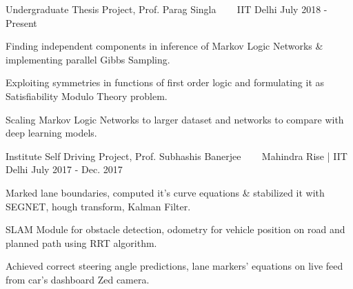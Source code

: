 


\begin{cventries}

  
  \cventry
  {Undergraduate Thesis Project, Prof. Parag Singla}
  {\href{https://github.com/saketdingliwal/MLN-Inference-Task}{}
    \ \ \ \normalfont\href{https://github.com/saketdingliwal/MLN-Inference-Task}
    {}}
  {IIT Delhi}
  {July 2018 - Present}
  {
    \begin{cvitems}
    \item Finding independent components in inference of Markov Logic Networks \& implementing parallel Gibbs Sampling.
    \item Exploiting symmetries in functions of first order logic and formulating it as Satisfiability Modulo Theory problem.
    \item Scaling Markov Logic Networks to larger dataset and networks to compare with deep learning models.
    \end{cvitems}
  }

  \cventry
  {Institute Self Driving Project, Prof. Subhashis Banerjee}
  {\href{https://github.com/AniketBajpai/AutoNav2}{}
    \ \ \ \normalfont\href{https://github.com/AniketBajpai/AutoNav2}
    {}}
  {Mahindra Rise | IIT Delhi}
  {July 2017 - Dec. 2017}
  {
    \begin{cvitems}
    \item Marked lane boundaries, computed it's curve equations \& stabilized it with SEGNET, hough transform, Kalman Filter.
    \item SLAM Module for obstacle detection, odometry for         vehicle position on road and planned path using RRT         algorithm.
    \item Achieved correct steering angle predictions, lane markers' equations on live feed from car's dashboard Zed camera.
    \end{cvitems}
  }


\end{cventries}
